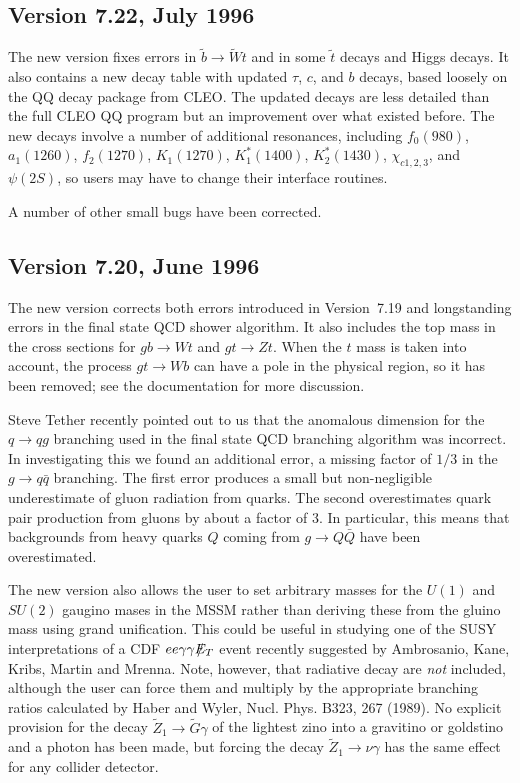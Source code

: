 \subsection{Version 7.22, July 1996}

      The new version fixes errors in $\tilde b \to \tilde W t$ and in
some $\tilde t$ decays and Higgs decays. It also contains a new decay
table with updated $\tau$, $c$, and $b$ decays, based loosely on the
QQ decay package from CLEO.  The updated decays are less detailed than
the full CLEO QQ program but an improvement over what existed before.
The new decays involve a number of additional resonances, including
$f_0(980)$, $a_1(1260)$, $f_2(1270)$, $K_1(1270)$, $K_1^*(1400)$,
$K_2^*(1430)$, $\chi_{c1,2,3}$, and $\psi(2S)$, so users may have to
change their interface routines.

      A number of other small bugs have been corrected.

\subsection{Version 7.20, June 1996}

      The new version corrects both errors introduced in Version~7.19
and longstanding errors in the final state QCD shower algorithm. It
also includes the top mass in the cross sections for $g b \to W t$ and
$g t \to Z t$. When the $t$ mass is taken into account, the process $g
t \to W b$ can have a pole in the physical region, so it has been
removed; see the documentation for more discussion. 

        Steve Tether recently pointed out to us that the anomalous
dimension for the $q \to q g$ branching used in the final state QCD
branching algorithm was incorrect. In investigating this we found an
additional error, a missing factor of $1/3$ in the $g \to q \bar q$
branching. The first error produces a small but non-negligible
underestimate of gluon radiation from quarks. The second overestimates
quark pair production from gluons by about a factor of 3. In
particular, this means that backgrounds from heavy quarks $Q$ coming
from $g \to Q \bar Q$ have been overestimated.

      The new version also allows the user to set arbitrary masses
for the $U(1)$ and $SU(2)$ gaugino mases in the MSSM rather than
deriving these from the gluino mass using grand unification. This
could be useful in studying one of the SUSY interpretations of a CDF
$ee\gamma\gamma\etmiss$ event recently suggested by Ambrosanio, Kane,
Kribs, Martin and Mrenna.  Note, however, that radiative decay are
{\it not} included, although the user can force them and multiply by
the appropriate branching ratios calculated by Haber and Wyler,
Nucl.{} Phys.{} B323, 267 (1989). No explicit provision for the decay
$\tilde Z_1 \to \tilde G \gamma$ of the lightest zino into a gravitino
or goldstino and a photon has been made, but forcing the decay $\tilde
Z_1 \to \nu\gamma$ has the same effect for any collider detector.

